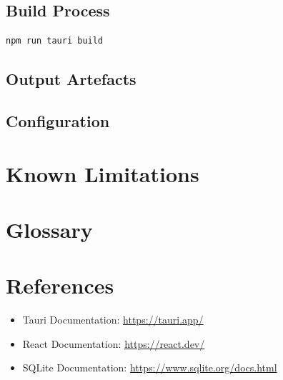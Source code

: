 \documentclass[12pt, a4paper]{report}
\begin{document}
	\section{Build Process}
	
	\begin{lstlisting}[language=bash, caption={Production build}]
		npm run tauri build
	\end{lstlisting}
	
	\section{Output Artefacts}
	
	\section{Configuration}
	
	\chapter{Known Limitations}
	
	
	\appendix
	
	\chapter{Glossary}
	
	\chapter{References}
	
	\begin{itemize}
		\item Tauri Documentation: \url{https://tauri.app/}
		\item React Documentation: \url{https://react.dev/}
		\item SQLite Documentation: \url{https://www.sqlite.org/docs.html}
	\end{itemize}
	
\end{document}
